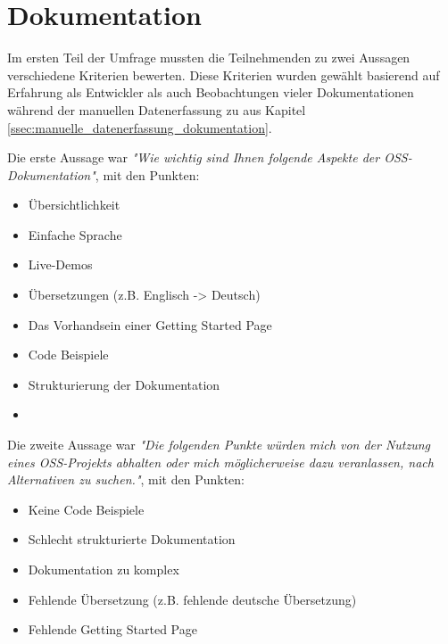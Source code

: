 \section{Dokumentation}

Im ersten Teil der Umfrage mussten die Teilnehmenden zu zwei Aussagen verschiedene Kriterien bewerten.
Diese Kriterien wurden gewählt basierend auf Erfahrung als Entwickler als auch Beobachtungen vieler
Dokumentationen während der manuellen Datenerfassung zu aus Kapitel
\ref{ssec:manuelle_datenerfassung_dokumentation}.


\bigskip
\noindent
Die erste Aussage war \textit{"Wie wichtig sind Ihnen folgende Aspekte der OSS-Dokumentation"}, mit den Punkten:
\begin{multicols}{2}
    \begin{itemize}
        \setlength\itemsep{0em}
        \item Übersichtlichkeit
        \item Einfache Sprache
        \item Live-Demos
        \item Übersetzungen (z.B. Englisch -> Deutsch)
        \item Das Vorhandsein einer Getting Started Page
        \item Code Beispiele
        \item Strukturierung der Dokumentation
        \item []
    \end{itemize}
\end{multicols}

\bigskip
\noindent
Die zweite Aussage war \textit{"Die folgenden Punkte würden mich von der Nutzung eines OSS-Projekts
    abhalten oder mich möglicherweise dazu veranlassen, nach Alternativen zu suchen."}, mit den Punkten:

\begin{multicols}{2}
    \begin{itemize}
        \setlength\itemsep{0em}
        \item Keine Code Beispiele
        \item Schlecht strukturierte Dokumentation
        \item Dokumentation zu komplex
        \item Fehlende Übersetzung (z.B. fehlende deutsche Übersetzung)
        \item Fehlende Getting Started Page
    \end{itemize}
\end{multicols}



